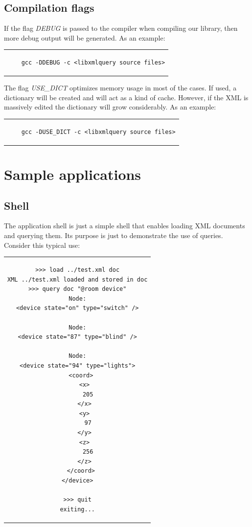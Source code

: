 \documentclass[a4paper]{report}
\begin{document}
	\section{Compilation flags}	
		If the flag \emph{DEBUG} is passed to the compiler when compiling our library, then more debug output will be generated. As an example:
	
	\begin{center}
	\lstset{language=bash,caption=Compiling libxmlquery with debug output, captionpos=b}
	\begin{tabular}{c}
	\begin{lstlisting}
	gcc -DDEBUG -c <libxmlquery source files>
	\end{lstlisting}
	\end{tabular}
	\end{center}
		
		The flag \emph{USE\_DICT} optimizes memory usage in most of the cases. If used, a dictionary will be created and will act as a kind of cache. However, if the XML is massively edited the dictionary will grow 
		considerably. As an example:
		
	\begin{center}
	\lstset{language=bash,caption=Compiling libxmlquery with dictionary optimization, captionpos=b}
	\begin{tabular}{c}
	\begin{lstlisting}
	gcc -DUSE_DICT -c <libxmlquery source files>
	\end{lstlisting}
	\end{tabular}
	\end{center}
		
	
\chapter{Sample applications}\label{chap:app} %
	\section{Shell}
		The application shell is just a simple shell that enables loading XML documents and querying them. Its purpose is just to demonstrate the use of queries. Consider this typical use:

\begin{center}
\lstset{language=bash,caption=Typical usage of the shell application. The banner was intentionally removed., captionpos=b}
\begin{tabular}{c}
\begin{lstlisting}		
>>> load ../test.xml doc
XML ../test.xml loaded and stored in doc
>>> query doc "@room device"
Node:
<device state="on" type="switch" />

Node:
<device state="87" type="blind" />

Node:
<device state="94" type="lights">
  <coord>
    <x>
      205
    </x>
    <y>
      97
    </y>
    <z>
      256
    </z>
  </coord>
</device>

>>> quit
exiting...
\end{lstlisting}
\end{tabular}
\end{center}
		
\end{document}
